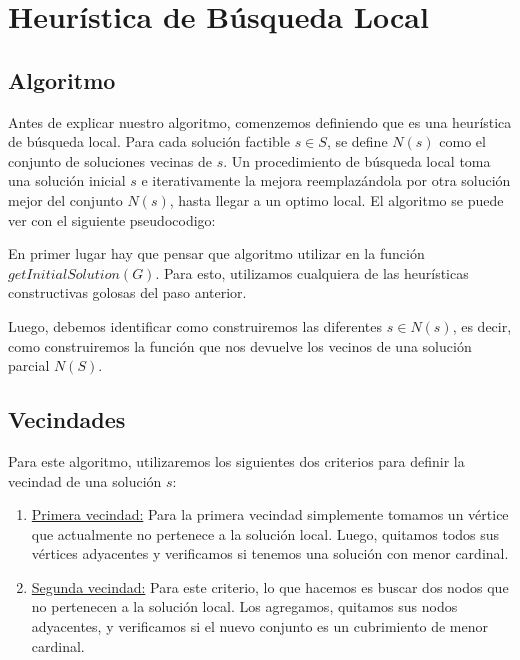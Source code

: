 \section{Heurística de Búsqueda Local}

\subsection{Algoritmo}

Antes de explicar nuestro algoritmo, comenzemos definiendo que es una heurística de búsqueda local. Para cada solución factible $s \in S$, se define $N(s)$ como el conjunto de soluciones vecinas de $s$. Un procedimiento de búsqueda local toma una solución inicial $s$ e iterativamente la mejora reemplazándola por otra solución mejor del conjunto $N(s)$, hasta llegar a un optimo local. El algoritmo se puede ver con el siguiente pseudocodigo:

\begin{algorithmic}
		\EndIf
	\EndFor
\EndWhile
\EndProcedure
\end{algorithmic}

\hspace{1px}

En primer lugar hay que pensar que algoritmo utilizar en la función $getInitialSolution(G)$. Para esto, utilizamos cualquiera de las heurísticas constructivas golosas del paso anterior.

Luego, debemos identificar como construiremos las diferentes $s \in N(s)$, es decir, como construiremos la función que nos devuelve los vecinos de una solución parcial $N(S)$.

\subsection{Vecindades}

Para este algoritmo, utilizaremos los siguientes dos criterios para definir la vecindad de una solución $s$:

\begin{enumerate}
\item \underline{Primera vecindad:}
Para la primera vecindad simplemente tomamos un vértice que actualmente no pertenece a la solución local. Luego, quitamos todos sus vértices adyacentes y verificamos si tenemos una solución con menor cardinal.
\item \underline{Segunda vecindad:}
Para este criterio, lo que hacemos es buscar dos nodos que no pertenecen a la solución local. Los agregamos, quitamos sus nodos adyacentes, y verificamos si el nuevo conjunto es un cubrimiento de menor cardinal.
\end{enumerate}

